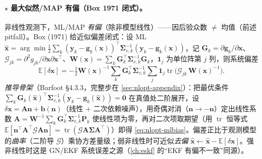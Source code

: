 \paragraph{$\star$ 最大似然/MAP 有偏（Box 1971 闭式）。}\cite{barfoot2024state}
非线性观测下，ML/MAP \emph{有偏}（除非模型线性）——因后验众数 $\neq$ 均值（前述 pitfall）。Box (1971) 给近似偏差闭式：设 ML $\hat{\mathbf{x}}=\arg\min\tfrac12\sum_k(\mathbf{y}_k-\mathbf{g}_k(\mathbf{x}))^\top\boldsymbol{\Sigma}_{v,k}^{-1}(\mathbf{y}_k-\mathbf{g}_k(\mathbf{x}))$，记 $\mathbf{G}_k=\partial\mathbf{g}_k/\partial\mathbf{x}$、$\boldsymbol{\mathcal{G}}_{jk}=\partial^2 g_{jk}/\partial\mathbf{x}\partial\mathbf{x}^\top$、$\mathbf{W}(\mathbf{x})=\sum_k\mathbf{G}_k^\top\boldsymbol{\Sigma}_{v,k}^{-1}\mathbf{G}_k$，$\mathbf{1}_j$ 为单位阵第 $j$ 列，则系统偏差
\begin{equation}
  \mathbb{E}[\delta\mathbf{x}]=-\tfrac12\mathbf{W}(\mathbf{x})^{-1}\sum_k\mathbf{G}_k^\top\boldsymbol{\Sigma}_{v,k}^{-1}\sum_j\mathbf{1}_j\operatorname{tr}\!\big(\boldsymbol{\mathcal{G}}_{jk}\,\mathbf{W}(\mathbf{x})^{-1}\big).
  \label{eq:nlopt-mlbias}
\end{equation}
\emph{推导骨架}（Barfoot\cite{barfoot2024state} §4.3.3，完整步在 \cref{sec:nlopt-appendix}）：把最优条件 $\sum_k\mathbf{G}_k(\hat{\mathbf{x}})^\top\boldsymbol{\Sigma}_{v,k}^{-1}(\mathbf{y}_k-\mathbf{g}_k(\hat{\mathbf{x}}))=\mathbf{0}$ 在真值处二阶展开，设 $\delta\mathbf{x}=\mathbf{A}\mathbf{n}+\mathbf{b}(\mathbf{n})$（线性 $+$ 二次依赖噪声），用奇偶对消（$\mathbf{n}\to-\mathbf{n}$）定出线性系数 $\mathbf{A}=\mathbf{W}^{-1}\sum_k\mathbf{G}_k^\top\boldsymbol{\Sigma}_{v,k}^{-1}\mathbf{P}_k$ 使线性项为零，再对二次项取期望（用 $\operatorname{tr}$ 恒等式 $\mathbb{E}[\mathbf{n}^\top\mathbf{A}^\top\boldsymbol{\mathcal{G}}\mathbf{A}\mathbf{n}]=\operatorname{tr}(\boldsymbol{\mathcal{G}}\mathbf{A}\boldsymbol{\Sigma}\mathbf{A}^\top)$）即得 \cref{eq:nlopt-mlbias}。偏差正比于观测模型的\emph{曲率}（二阶导 $\boldsymbol{\mathcal{G}}$）乘协方差量级；弱非线性时可近似\emph{去偏} $\hat{\mathbf{x}}\leftarrow\hat{\mathbf{x}}-\mathbb{E}[\delta\mathbf{x}]$。强非线性时这是 GN/EKF 系统误差之源（\cref{ch:eskf} 的“EKF 有偏不一致”同源）。

